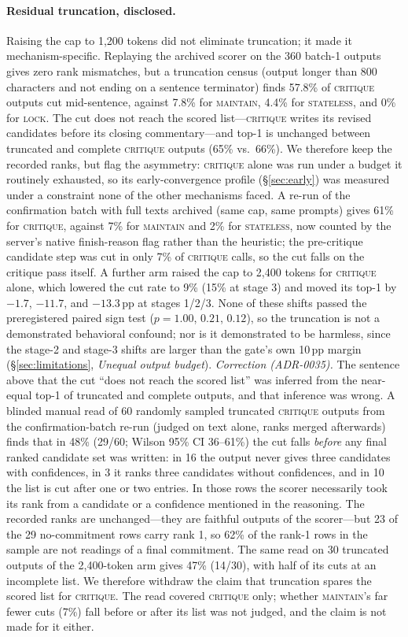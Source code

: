 \documentclass[10pt]{article}
\newcommand{\Mstate}{\textsc{stateless}}
\newcommand{\Mlock}{\textsc{lock}}
\newcommand{\Mmaint}{\textsc{maintain}}
\newcommand{\Mcrit}{\textsc{critique}}
\begin{document}
\paragraph{Residual truncation, disclosed.}
Raising the cap to 1{,}200 tokens did not eliminate truncation; it made
it mechanism-specific. Replaying the archived scorer on the 360 batch-1
outputs gives zero rank mismatches, but a truncation census (output
longer than 800 characters and not ending on a sentence terminator)
finds 57.8\% of \Mcrit{} outputs cut mid-sentence, against 7.8\% for
\Mmaint{}, 4.4\% for \Mstate{}, and 0\% for \Mlock{}. The cut does not
reach the scored list---\Mcrit{} writes its revised candidates before
its closing commentary---and top-1 is unchanged between truncated and
complete \Mcrit{} outputs (65\% vs.\ 66\%). We therefore keep the
recorded ranks, but flag the asymmetry: \Mcrit{} alone was run under a
budget it routinely exhausted, so its early-convergence profile
(\S\ref{sec:early}) was measured under a constraint none of the other
mechanisms faced. A re-run of the confirmation batch with full texts
archived (same cap, same prompts) gives 61\% for \Mcrit{}, against 7\% for
\Mmaint{} and 2\% for \Mstate{}, now counted by the server's native
finish-reason flag rather than the heuristic; the pre-critique candidate
step was cut in only 7\% of \Mcrit{} calls, so the cut falls on the
critique pass itself. A further arm raised the cap to 2{,}400 tokens for
\Mcrit{} alone, which lowered the cut rate to 9\% (15\% at stage 3) and
moved its top-1 by $-1.7$, $-11.7$, and $-13.3$\,pp at stages 1/2/3.
None of these shifts passed the preregistered paired sign test
($p = 1.00$, $0.21$, $0.12$), so the truncation is not a demonstrated
behavioral confound; nor is it demonstrated to be harmless, since the
stage-2 and stage-3 shifts are larger than the gate's own 10\,pp margin
(\S\ref{sec:limitations}, \emph{Unequal output budget}).
\emph{Correction (ADR-0035).} The sentence above that the cut ``does
not reach the scored list'' was inferred from the near-equal top-1 of
truncated and complete outputs, and that inference was wrong. A blinded
manual read of 60 randomly sampled truncated \Mcrit{} outputs from the
confirmation-batch re-run (judged on text alone, ranks merged afterwards)
finds that in 48\% (29/60; Wilson 95\% CI 36--61\%) the cut falls
\emph{before} any final ranked candidate set was written: in 16 the
output never gives three candidates with confidences, in 3 it ranks
three candidates without confidences, and in 10 the list is cut after
one or two entries. In those rows the scorer necessarily took its rank
from a candidate or a confidence mentioned in the reasoning. The
recorded ranks are unchanged---they are faithful outputs of the
scorer---but 23 of the 29 no-commitment rows carry rank 1, so 62\% of
the rank-1 rows in the sample are not readings of a final commitment.
The same read on 30 truncated outputs of the 2{,}400-token arm gives
47\% (14/30), with half of its cuts at an incomplete list. We therefore
withdraw the claim that truncation spares the scored list for \Mcrit{}.
The read covered \Mcrit{} only; whether \Mmaint{}'s far fewer cuts
(7\%) fall before or after its list was not judged, and the claim is
not made for it either.
\end{document}
